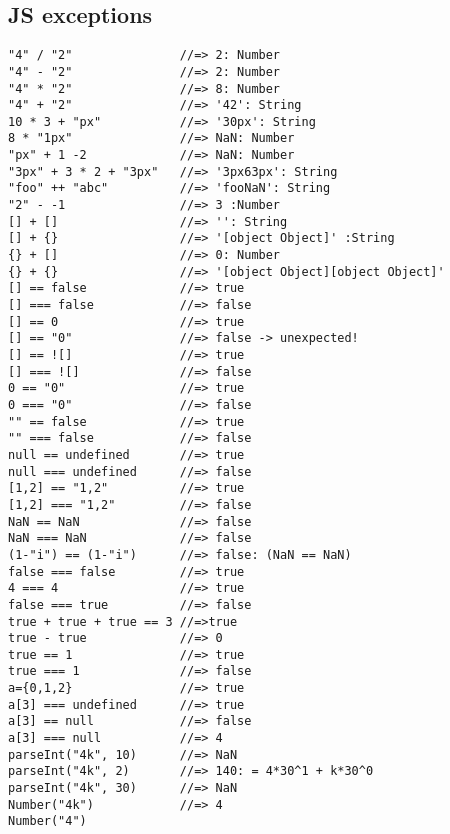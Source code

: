 \documentclass[main.tex,fontsize=6pt,paper=a4,paper=landscape,DIV=calc,]{scrartcl}
\begin{document}
\begin{multicols*}{4}
\section{JS exceptions}
\vspace{-2mm}
\begin{lstlisting}
"4" / "2"               //=> 2: Number
"4" - "2"               //=> 2: Number
"4" * "2"               //=> 8: Number
"4" + "2"               //=> '42': String
10 * 3 + "px"           //=> '30px': String
8 * "1px"               //=> NaN: Number
"px" + 1 -2             //=> NaN: Number
"3px" + 3 * 2 + "3px"   //=> '3px63px': String
"foo" ++ "abc"          //=> 'fooNaN': String
"2" - -1                //=> 3 :Number
[] + []                 //=> '': String
[] + {}                 //=> '[object Object]' :String
{} + []                 //=> 0: Number
{} + {}                 //=> '[object Object][object Object]'
[] == false             //=> true
[] === false            //=> false
[] == 0                 //=> true
[] == "0"               //=> false -> unexpected!
[] == ![]               //=> true
[] === ![]              //=> false
0 == "0"                //=> true
0 === "0"               //=> false
"" == false             //=> true
"" === false            //=> false
null == undefined       //=> true
null === undefined      //=> false
[1,2] == "1,2"          //=> true
[1,2] === "1,2"         //=> false
NaN == NaN              //=> false
NaN === NaN             //=> false
(1-"i") == (1-"i")      //=> false: (NaN == NaN)
false === false         //=> true
4 === 4                 //=> true
false === true          //=> false
true + true + true == 3 //=>true 
true - true             //=> 0   
true == 1               //=> true
true === 1              //=> false
a={0,1,2}               //=> true
a[3] === undefined      //=> true
a[3] == null            //=> false
a[3] === null           //=> 4   
parseInt("4k", 10)      //=> NaN 
parseInt("4k", 2)       //=> 140: = 4*30^1 + k*30^0
parseInt("4k", 30)      //=> NaN
Number("4k")            //=> 4
Number("4")              
\end{lstlisting}

\end{multicols*}
\end{document}
